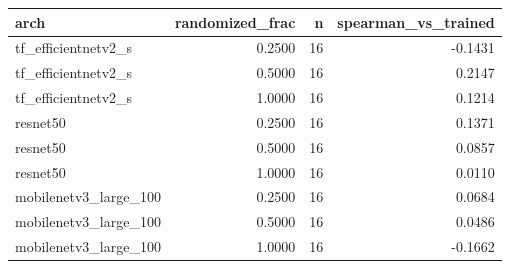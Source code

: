 \begin{tabular}{lrrr}
\toprule
arch & randomized\_frac & n & spearman\_vs\_trained \\
\midrule
tf\_efficientnetv2\_s & 0.2500 & 16 & -0.1431 \\
tf\_efficientnetv2\_s & 0.5000 & 16 & 0.2147 \\
tf\_efficientnetv2\_s & 1.0000 & 16 & 0.1214 \\
resnet50 & 0.2500 & 16 & 0.1371 \\
resnet50 & 0.5000 & 16 & 0.0857 \\
resnet50 & 1.0000 & 16 & 0.0110 \\
mobilenetv3\_large\_100 & 0.2500 & 16 & 0.0684 \\
mobilenetv3\_large\_100 & 0.5000 & 16 & 0.0486 \\
mobilenetv3\_large\_100 & 1.0000 & 16 & -0.1662 \\
\bottomrule
\end{tabular}
